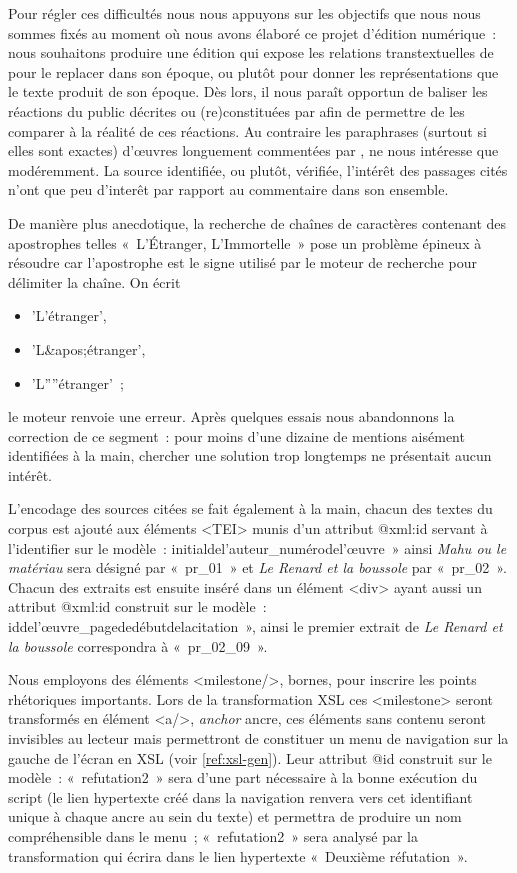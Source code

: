 Pour régler ces difficultés nous nous appuyons sur les objectifs que nous nous sommes fixés au moment où nous avons élaboré ce projet d'édition numérique~: nous souhaitons produire une édition qui expose les relations transtextuelles de \punr{} pour le replacer dans son époque, ou plutôt pour donner les représentations que le texte produit de son époque. Dès lors, il nous paraît opportun de baliser les réactions du public décrites ou (re)constituées par \robbe{} afin de permettre de les comparer à la réalité de ces réactions. Au contraire les paraphrases (surtout si elles sont exactes) d'œuvres longuement commentées par \robbe, ne nous intéresse que modéremment. La source identifiée, ou plutôt, vérifiée, l'intérêt des passages cités n'ont que peu d'interêt par rapport au commentaire dans son ensemble.

De manière plus anecdotique, la recherche de chaînes de caractères contenant des apostrophes telles «~L'Étranger, L'Immortelle~» pose un problème épineux à résoudre car l'apostrophe est le signe utilisé par le moteur de recherche pour délimiter la chaîne. On écrit 
\begin{itemize}
    \item 'L'étranger', 
    \item 'L\&apos;étranger',
    \item 'L''''étranger'~; 
\end{itemize}
le moteur renvoie une erreur. Après quelques essais nous abandonnons la correction de ce segment~: pour moins d'une dizaine de mentions aisément identifiées à la main, chercher une solution trop longtemps ne présentait aucun intérêt.


L'encodage des sources citées se fait également à la main, chacun des textes du corpus est ajouté aux éléments <TEI> munis d'un attribut @xml\NoAutoSpaceBeforeFDP:id servant à l'identifier sur le modèle~: initialdel'auteur\_numérodel'œuvre~» ainsi \textit{Mahu ou le matériau} sera désigné par «~pr\_01~» et \textit{Le Renard et la boussole} par «~pr\_02~». Chacun des extraits est ensuite inséré dans un élément <div> ayant aussi un attribut @xml\NoAutoSpaceBeforeFDP:id construit sur le modèle~: iddel'œuvre\_pagededébutdelacitation~», ainsi le premier extrait de \textit{Le Renard et la boussole} correspondra à «~pr\_02\_09~».    

\label{encMilestone} Nous employons des éléments <milestone/>, bornes, pour inscrire les points rhétoriques importants. Lors de la transformation XSL ces <milestone> seront transformés en élément <a/>, \textit{anchor} ancre, ces éléments sans contenu seront invisibles au lecteur mais permettront de constituer un menu de navigation sur la gauche de l'écran en XSL (voir \ref{ref:xsl-gen}). Leur attribut @id construit sur le modèle~: «~refutation2~»
sera d'une part nécessaire à la bonne exécution du script (le lien hypertexte créé dans la navigation renvera vers cet identifiant unique à chaque ancre au sein du texte) et permettra de produire un nom compréhensible dans le menu~; «~refutation2~» sera analysé par la transformation qui écrira dans le lien hypertexte «~Deuxième réfutation~».



